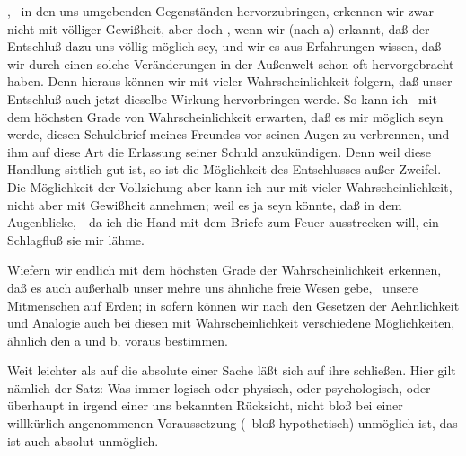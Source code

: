 \begin{aufza}
\begin{aufzb}
\item {}, \zB\ in den uns umgebenden Gegenständen hervorzubringen, erkennen wir zwar nicht mit völliger Gewißheit, aber doch , wenn wir (nach a) erkannt, daß der Entschluß dazu uns völlig möglich sey, und wir es aus Erfahrungen wissen, daß wir durch einen  solche Veränderungen in der Außenwelt schon oft hervorgebracht haben. Denn hieraus können wir mit vieler Wahrscheinlichkeit folgern, daß unser Entschluß auch jetzt dieselbe Wirkung hervorbringen werde. So kann ich \zB\ mit dem höchsten Grade von Wahrscheinlichkeit erwarten, daß es mir möglich seyn werde, diesen Schuldbrief meines Freundes vor seinen Augen zu verbrennen, und ihm auf diese Art die Erlassung seiner Schuld anzukündigen. Denn weil diese Handlung sittlich gut ist, so ist die Möglichkeit des Entschlusses außer Zweifel. Die Möglichkeit der Vollziehung aber kann ich nur mit vieler Wahrscheinlichkeit, nicht aber mit Gewißheit annehmen; weil es ja seyn könnte, daß in dem Augenblicke,~\ da ich die Hand mit dem Briefe zum Feuer ausstrecken will, ein Schlagfluß sie mir lähme.
\item Wiefern wir endlich mit dem höchsten Grade der Wahrscheinlichkeit erkennen, daß es auch außerhalb unser mehre uns ähnliche freie Wesen gebe, \zB\ unsere Mitmenschen auf Erden; in sofern können wir nach den Gesetzen der Aehnlichkeit und Analogie auch bei diesen mit Wahrscheinlichkeit verschiedene Möglichkeiten, ähnlich den a und b, voraus bestimmen.
\end{aufzb}
\item Weit leichter als auf die absolute  einer Sache läßt sich auf ihre  schließen. Hier gilt nämlich der Satz: Was immer logisch oder physisch, oder psychologisch, oder überhaupt in irgend einer uns bekannten Rücksicht, nicht bloß bei einer willkürlich angenommenen Voraussetzung (\dh\ bloß hypothetisch) unmöglich ist, das ist auch absolut unmöglich.
\end{aufza}
   
